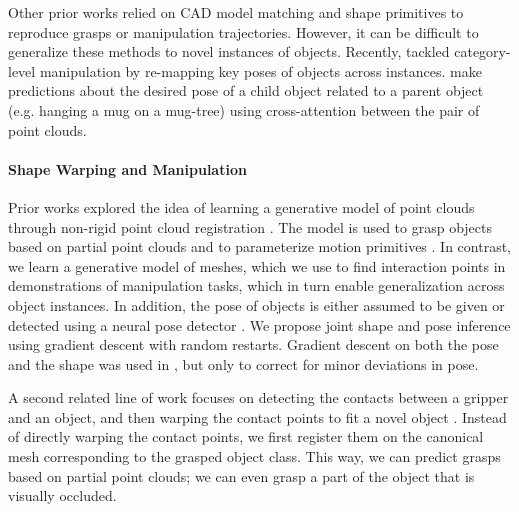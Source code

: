 \documentclass{article}
\begin{document}
Other prior works relied on CAD model matching \cite{klank09realtime,brook11collaborative,beetz11robotic,jakel12learning} and shape primitives \cite{miller03automatic} to reproduce grasps or manipulation trajectories. However, it can be difficult to generalize these methods to novel instances of objects. Recently, \citet{wen22you} tackled category-level manipulation by re-mapping key poses of objects across instances. \citet{pan22taxpose} make predictions about the desired pose of a child object related to a parent object (e.g. hanging a mug on a mug-tree) using cross-attention \cite{vaswani17attention} between the pair of point clouds.

\paragraph{Shape Warping and Manipulation}

Prior works explored the idea of learning a generative model of point clouds through non-rigid point cloud registration \cite{rodriguez18transferring,rodriguez18transferringa,klamt18supervised,thompson21shapebased}. The model is used to grasp objects based on partial point clouds \cite{rodriguez18transferring,rodriguez18transferringa,klamt18supervised} and to parameterize motion primitives \cite{thompson21shapebased}. In contrast, we learn a generative model of meshes, which we use to find interaction points in demonstrations of manipulation tasks, which in turn enable generalization across object instances. In addition, the pose of objects is either assumed to be given \cite{thompson21shapebased} or detected using a neural pose detector \cite{klamt18supervised}. We propose joint shape and pose inference using gradient descent with random restarts. Gradient descent on both the pose and the shape was used in \cite{rodriguez18transferring,rodriguez18transferringa}, but only to correct for minor deviations in pose. %

A second related line of work focuses on detecting the contacts between a gripper and an object, and then warping the contact points to fit a novel object \cite{li07datadriven,benamor12generalization,hillenbrand12transferring,jakel12learning,stouraitis15functional,rodriguez18learning,pavlichenko19autonomous,tian19transferring}. Instead of directly warping the contact points, we first register them on the canonical mesh corresponding to the grasped object class. This way, we can predict grasps based on partial point clouds; we can even grasp a part of the object that is visually occluded. %
\end{document}
